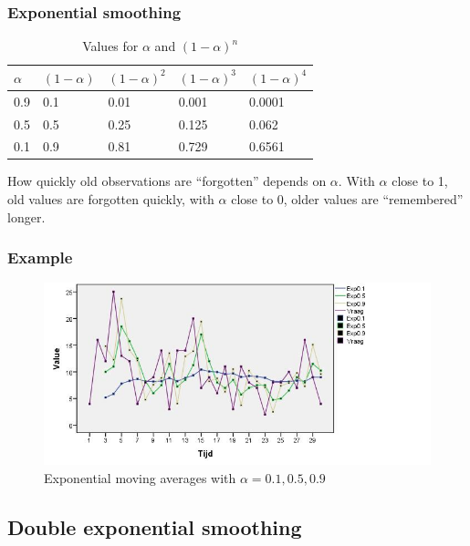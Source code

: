 \documentclass{beamer}
\begin{document}
\begin{frame}
  \frametitle{Exponential smoothing}

  \begin{table}
    \centering
    \begin{tabular}{l|llll}
      $\alpha$ & $(1-\alpha)$ & $(1-\alpha)^{2}$ & $(1-\alpha)^{3}$ & $(1-\alpha)^{4}$ \\ \hline
      0.9   & 0.1       & 0.01             & 0.001                      & 0.0001           \\
      0.5   & 0.5       & 0.25             & 0.125                      & 0.062            \\
      0.1   & 0.9       & 0.81             & 0.729                      & 0.6561           \\
    \end{tabular}
    \caption{Values for $\alpha$ and $(1-\alpha)^{n}$}
    \label{tab:alpha}
  \end{table}
  How quickly old observations are ``forgotten'' depends on $\alpha$. With $\alpha$ close to 1, old values are forgotten quickly, with $\alpha$ close to 0, older values are ``remembered'' longer.
\end{frame}


\begin{frame}
  \frametitle{Example}
  \begin{figure}[htbp]
    \centering
    \includegraphics[width=\textwidth]{img/tijdreeks51}
    \caption{Exponential moving averages with $\alpha=0.1 , 0.5, 0.9$}
    \label{fig:tijdreeks51}
  \end{figure}
\end{frame}

\subsection{Double exponential smoothing}
\end{document}
